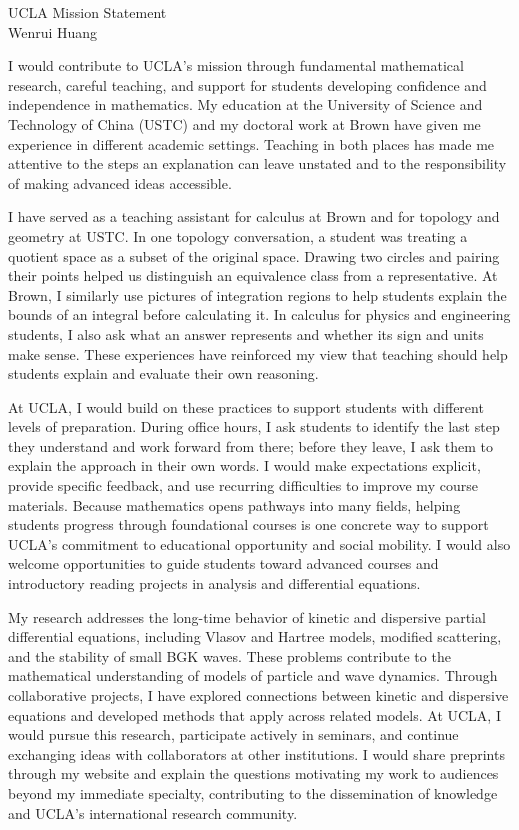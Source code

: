 \documentclass[11pt]{article}
\begin{document}
\begin{center}
{\Large UCLA Mission Statement}\\[6pt]
{\large Wenrui Huang}
\end{center}
\vspace{2pt}

I would contribute to UCLA's mission through fundamental mathematical research,
careful teaching, and support for students developing confidence and independence
in mathematics. My education at the University of Science and Technology of China
(USTC) and my doctoral work at Brown have given me experience in different academic
settings. Teaching in both places has made me attentive to the steps an explanation
can leave unstated and to the responsibility of making advanced ideas accessible.

I have served as a teaching assistant for calculus at Brown and for topology and
geometry at USTC. In one topology conversation, a student was treating
a quotient space as a subset of the original space. Drawing two circles and pairing
their points helped us distinguish an equivalence class from a representative.
At Brown, I similarly use pictures of integration regions to help students explain
the bounds of an integral before calculating it. In calculus for physics and
engineering students, I also ask what an answer represents and whether its sign
and units make sense. These experiences have reinforced my view that teaching
should help students explain and evaluate their own reasoning.

At UCLA, I would build on these practices to support students with different
levels of preparation. During office hours, I ask students to identify the last
step they understand and work forward from there; before they leave, I ask them
to explain the approach in their own words. I would make expectations explicit,
provide specific feedback, and use recurring difficulties to improve my course
materials. Because mathematics opens pathways into many fields, helping students
progress through foundational courses is one concrete way to support UCLA's
commitment to educational opportunity and social mobility. I would also welcome
opportunities to guide students toward advanced courses and introductory reading
projects in analysis and differential equations.

My research addresses the long-time behavior of kinetic and dispersive partial
differential equations, including Vlasov and Hartree models, modified scattering,
and the stability of small BGK waves. These problems contribute to the mathematical
understanding of models of particle and wave dynamics. Through collaborative
projects, I have explored connections between kinetic and dispersive equations
and developed methods that apply across related models. At UCLA, I would pursue
this research, participate actively in seminars, and continue exchanging ideas
with collaborators at other institutions. I would share preprints through my
website and explain the questions motivating my work to audiences beyond my
immediate specialty, contributing to the dissemination of knowledge and UCLA's
international research community.
\end{document}
